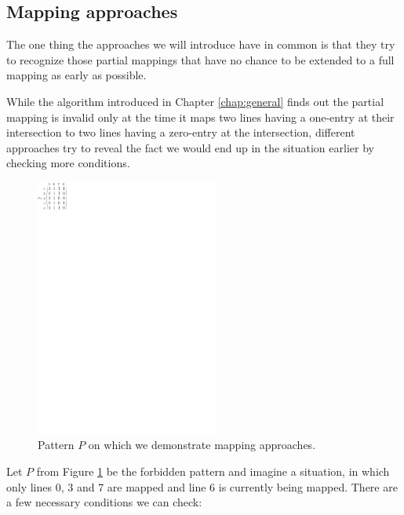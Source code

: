 \subsection{Mapping approaches}
\label{sect:approaches}
The one thing the approaches we will introduce have in common is that they try to recognize those partial mappings that have no chance to be extended to a full mapping as early as possible.

While the algorithm introduced in Chapter \ref{chap:general} finds out the partial mapping is invalid only at the time it maps two lines having a one-entry at their intersection to two lines having a zero-entry at the intersection, different approaches try to reveal the fact we would end up in the situation earlier by checking more conditions.
\begin{figure}[h!]
\centering
\includegraphics[width=60mm]{../img/approaches.pdf}
\caption{Pattern $P$ on which we demonstrate mapping approaches.}
\label{approaches}
\end{figure}
Let $P$ from Figure \ref{approaches} be the forbidden pattern and imagine a situation, in which only lines 0, 3 and 7 are mapped and line 6 is currently being mapped. There are a few necessary conditions we can check:
